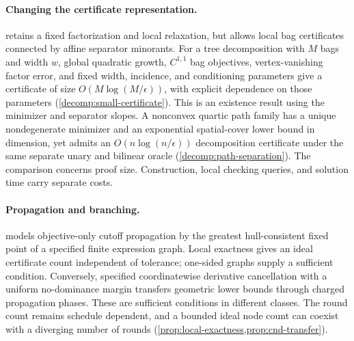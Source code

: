 \paragraph{Changing the certificate representation.}
 retains a fixed factorization and local relaxation,
but allows local bag certificates connected by affine separator minorants.
For a tree decomposition with $M$ bags and width $w$, global quadratic
growth, $C^{1,1}$ bag objectives, vertex-vanishing factor error, and fixed width,
incidence, and conditioning parameters give a certificate of size
$O(M\log(M/\epsilon))$, with explicit dependence on those parameters
(\cref{decomp:small-certificate}). This is an existence result using the
minimizer and separator slopes. A nonconvex quartic path family has a unique
nondegenerate minimizer and an exponential spatial-cover lower bound in
dimension, yet admits an $O(n\log(n/\epsilon))$ decomposition certificate
under the same separate unary and bilinear oracle
(\cref{decomp:path-separation}). The comparison concerns
proof size. Construction, local checking queries, and solution time carry
separate costs.

\paragraph{Propagation and branching.}
 models objective-only cutoff propagation by the
greatest hull-consistent fixed point of a specified finite expression graph.
Local exactness gives an ideal certificate count independent of tolerance;
one-sided graphs supply a sufficient condition. Conversely, specified
coordinatewise derivative cancellation with a uniform no-dominance margin
transfers geometric lower bounds through charged propagation phases. These
are sufficient conditions in different classes. The round count remains
schedule dependent, and a bounded ideal node count can coexist with a
diverging number of rounds
(\cref{prop:local-exactness,prop:cnd-transfer}).

